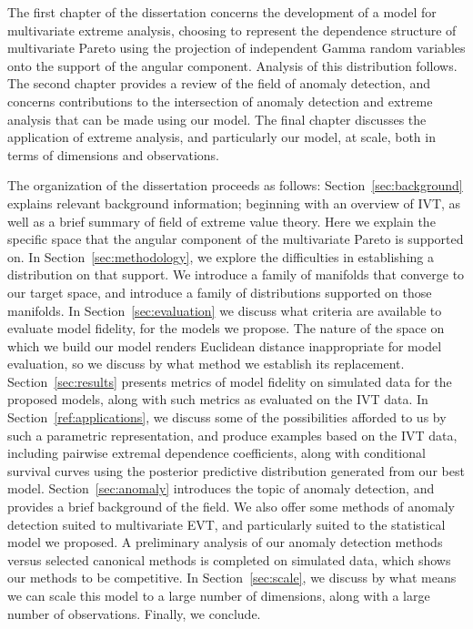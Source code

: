 The first chapter of the dissertation concerns the development of a model for multivariate extreme analysis,
  choosing to represent the dependence structure of multivariate Pareto using the projection of independent
  Gamma random variables onto the support of the angular component.  Analysis of this distribution follows.
  The second chapter provides a review of the field of anomaly detection, and concerns contributions
  to the intersection of anomaly detection and extreme analysis that can be made using our model.
  The final chapter discusses the application of extreme analysis, and particularly our model, at scale,
  both in terms of dimensions and observations.

The organization of the dissertation proceeds as follows:
  Section~\ref{sec:background} explains relevant background information; beginning with an overview of
  IVT, as well as a brief summary of field of extreme value theory.  Here we explain the specific space
  that the angular component of the multivariate Pareto is supported on. In Section~\ref{sec:methodology},
  we explore the difficulties in establishing a distribution on that support.  We introduce a family of
  manifolds that converge to our target space, and introduce a family of distributions supported on those
  manifolds.  In Section~\ref{sec:evaluation} we discuss what criteria are available to evaluate model
  fidelity, for the models we propose.  The nature of the space on which we build our model renders Euclidean
  distance inappropriate for model evaluation, so we discuss by what method we establish its replacement.
  Section~\ref{sec:results} presents metrics of model fidelity on simulated data for the proposed models,
  along with such metrics as evaluated on the IVT data.  In Section~\ref{ref:applications}, we discuss
  some of the possibilities afforded to us by such a parametric representation, and produce examples
  based on the IVT data, including pairwise extremal dependence coefficients, along with conditional
  survival curves using the posterior predictive distribution generated from our best model.
  Section~\ref{sec:anomaly} introduces the topic of anomaly detection, and provides a brief background
  of the field.  We also offer some methods of anomaly detection suited to multivariate EVT, and
  particularly suited to the statistical model we proposed. A preliminary analysis of our anomaly
  detection methods versus selected canonical methods is completed on simulated data, which shows
  our methods to be competitive.  In Section~\ref{sec:scale}, we discuss by what means we can scale
  this model to a large number of dimensions, along with a large number of observations.  Finally, we
  conclude.


















